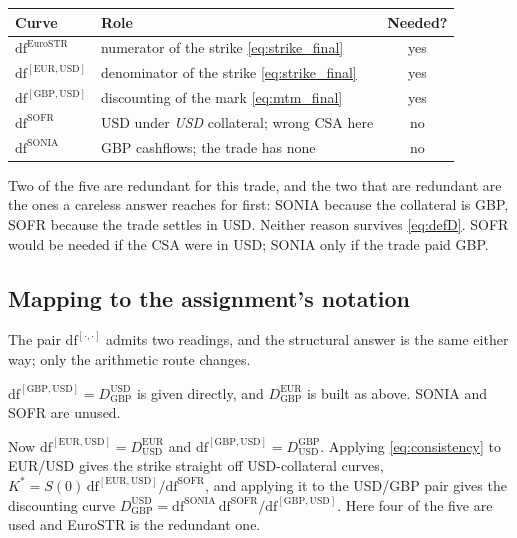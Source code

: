 \documentclass[11pt]{article}
\newcommand{\D}[2]{D_{#1}^{#2}}
\begin{document}
\begin{center}
\begin{tabular}{llc}
\toprule
Curve & Role & Needed? \\
\midrule
$\mathrm{df}^{\mathrm{EuroSTR}}$          & numerator of the strike \eqref{eq:strike_final}      & yes \\
$\mathrm{df}^{[\mathrm{EUR},\mathrm{USD}]}$ & denominator of the strike \eqref{eq:strike_final}   & yes \\
$\mathrm{df}^{[\mathrm{GBP},\mathrm{USD}]}$ & discounting of the mark \eqref{eq:mtm_final}        & yes \\
$\mathrm{df}^{\mathrm{SOFR}}$             & USD under \emph{USD} collateral; wrong CSA here      & no \\
$\mathrm{df}^{\mathrm{SONIA}}$            & GBP cashflows; the trade has none                    & no \\
\bottomrule
\end{tabular}
\end{center}

Two of the five are redundant for this trade, and the two that are redundant are the ones
a careless answer reaches for first: SONIA because the collateral is GBP, SOFR because the
trade settles in USD. Neither reason survives \eqref{eq:defD}. SOFR would be needed if the
CSA were in USD; SONIA only if the trade paid GBP.

\subsection{Mapping to the assignment's notation}

The pair $\mathrm{df}^{[\cdot,\cdot]}$ admits two readings, and the structural answer is
the same either way; only the arithmetic route changes.

\begin{description}[leftmargin=*,style=nextline]
\item[Reading A, $\mathrm{df}^{[c,y]}$ is cashflow $y$ under collateral $c$
  (used above).]
  $\mathrm{df}^{[\mathrm{GBP},\mathrm{USD}]} = \D{\mathrm{GBP}}{\mathrm{USD}}$ is given
  directly, and $\D{\mathrm{GBP}}{\mathrm{EUR}}$ is built as above. SONIA and SOFR are
  unused.
\item[Reading B, $\mathrm{df}^{[y,c]}$ is cashflow $y$ under collateral $c$.]
  Now $\mathrm{df}^{[\mathrm{EUR},\mathrm{USD}]} = \D{\mathrm{USD}}{\mathrm{EUR}}$ and
  $\mathrm{df}^{[\mathrm{GBP},\mathrm{USD}]} = \D{\mathrm{USD}}{\mathrm{GBP}}$. Applying
  \eqref{eq:consistency} to EUR/USD gives the strike straight off USD-collateral curves,
  $K^\ast = S(0)\,\mathrm{df}^{[\mathrm{EUR},\mathrm{USD}]}/\mathrm{df}^{\mathrm{SOFR}}$,
  and applying it to the USD/GBP pair gives the discounting curve
  $\D{\mathrm{GBP}}{\mathrm{USD}} = \mathrm{df}^{\mathrm{SONIA}}\,
  \mathrm{df}^{\mathrm{SOFR}}/\mathrm{df}^{[\mathrm{GBP},\mathrm{USD}]}$. Here four of
  the five are used and EuroSTR is the redundant one.
\end{description}
\end{document}
